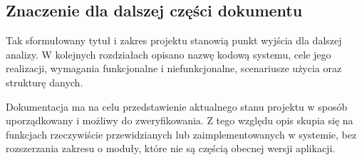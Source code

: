 \subsection{Znaczenie dla dalszej części dokumentu}

Tak sformułowany tytuł i zakres projektu stanowią punkt wyjścia dla dalszej analizy. W kolejnych rozdziałach opisano nazwę kodową systemu, cele jego realizacji, wymagania funkcjonalne i niefunkcjonalne, scenariusze użycia oraz strukturę danych.

Dokumentacja ma na celu przedstawienie aktualnego stanu projektu w sposób uporządkowany i możliwy do zweryfikowania. Z tego względu opis skupia się na funkcjach rzeczywiście przewidzianych lub zaimplementowanych w systemie, bez rozszerzania zakresu o moduły, które nie są częścią obecnej wersji aplikacji.